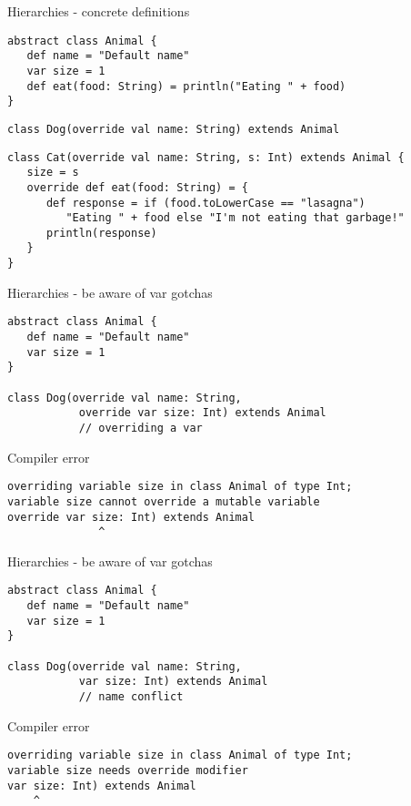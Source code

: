 \begin{frame}[fragile]{Hierarchies - concrete definitions}
\begin{lstlisting}
abstract class Animal {
   def name = "Default name"
   var size = 1
   def eat(food: String) = println("Eating " + food)
}
\end{lstlisting}

\begin{lstlisting}
class Dog(override val name: String) extends Animal
\end{lstlisting}

\begin{lstlisting}
class Cat(override val name: String, s: Int) extends Animal {
   size = s
   override def eat(food: String) = {
      def response = if (food.toLowerCase == "lasagna")
         "Eating " + food else "I'm not eating that garbage!"     
      println(response)
   }
}
\end{lstlisting}
\end{frame}

\begin{frame}[fragile]{Hierarchies - be aware of var gotchas}
\begin{lstlisting}
abstract class Animal {
   def name = "Default name"
   var size = 1
}

class Dog(override val name: String,
           override var size: Int) extends Animal 
           // overriding a var
\end{lstlisting}
\begin{alertblock}{Compiler error}
\begin{lstlisting}
overriding variable size in class Animal of type Int;
variable size cannot override a mutable variable
override var size: Int) extends Animal
              ^
\end{lstlisting}
\end{alertblock}
\end{frame}

\begin{frame}[fragile]{Hierarchies - be aware of var gotchas}
\begin{lstlisting}
abstract class Animal {
   def name = "Default name"
   var size = 1
}

class Dog(override val name: String,
           var size: Int) extends Animal 
           // name conflict
\end{lstlisting}
\begin{alertblock}{Compiler error}
\begin{lstlisting}
overriding variable size in class Animal of type Int;
variable size needs override modifier
var size: Int) extends Animal
    ^
\end{lstlisting}
\end{alertblock}
\end{frame}

